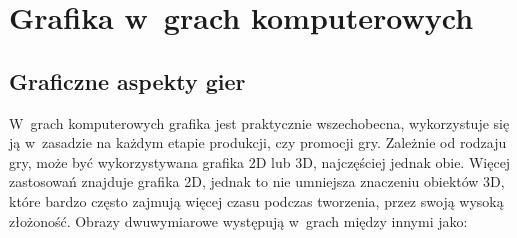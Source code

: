 \documentclass[12pt,a4paper,oneside]{book}
\theoremstyle{definition}
\numberwithin{equation}{chapter}
\begin{document}
\section{Grafika w~grach komputerowych}

\subsection{Graficzne aspekty gier}

\par W~grach komputerowych grafika jest praktycznie wszechobecna, wykorzystuje się ją w~zasadzie na każdym etapie produkcji, czy promocji gry. Zależnie od rodzaju gry, może być wykorzystywana grafika 2D lub 3D, najczęściej jednak obie. Więcej zastosowań znajduje grafika 2D, jednak to nie umniejsza znaczeniu obiektów 3D, które bardzo często zajmują więcej czasu podczas tworzenia, przez swoją wysoką złożoność. Obrazy dwuwymiarowe występują w~grach między innymi jako:
\end{document}
